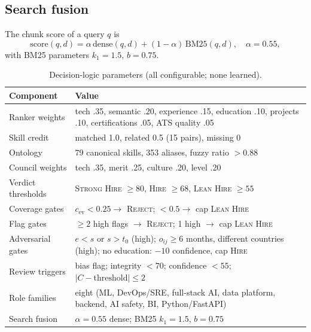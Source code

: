 \documentclass[conference]{IEEEtran}
\newcommand{\verd}[1]{\textsc{#1}}
\newcommand{\Sstrong}{\verd{Strong Hire}}
\newcommand{\Shire}{\verd{Hire}}
\newcommand{\Slean}{\verd{Lean Hire}}
\newcommand{\Sreject}{\verd{Reject}}
\begin{document}
\subsection{Search fusion}
The chunk score of a query $q$ is
\begin{equation}
\mathrm{score}(q,d)=\alpha\,\mathrm{dense}(q,d)+(1-\alpha)\,\mathrm{BM25}(q,d),\quad \alpha=0.55,
\label{eq:fusion}
\end{equation}
with BM25 parameters $k_1=1.5$, $b=0.75$.

\begin{table}[t]
\caption{Decision-logic parameters (all configurable; none learned).}
\label{tab:params}
\centering
\footnotesize
\renewcommand{\arraystretch}{1.1}
\begin{tabular}{@{}lp{5.6cm}@{}}
\toprule
Component & Value \\
\midrule
Ranker weights & tech .35, semantic .20, experience .15, education .10, projects .10, certifications .05, ATS quality .05 \\
Skill credit & matched 1.0, related 0.5 (15 pairs), missing 0 \\
Ontology & 79 canonical skills, 353 aliases, fuzzy ratio $>0.88$ \\
Council weights & tech .35, merit .25, culture .20, level .20 \\
Verdict thresholds & \Sstrong{} $\ge80$, \Shire{} $\ge68$, \Slean{} $\ge55$ \\
Coverage gates & $c_{\mathrm{ev}}<0.25\rightarrow$ \Sreject{}; $<0.5\rightarrow$ cap \Slean{} \\
Flag gates & $\ge2$ high flags $\rightarrow$ \Sreject{}; 1 high $\rightarrow$ cap \Slean{} \\
Adversarial gates & $e<s$ or $s>t_0$ (high); $o_{ij}\ge6$ months, different countries (high); no education: $-10$ confidence, cap \Shire{} \\
Review triggers & bias flag; integrity $<70$; confidence $<55$; $|C-\text{threshold}|\le2$ \\
Role families & eight (ML, DevOps/SRE, full-stack AI, data platform, backend, AI safety, BI, Python/FastAPI) \\
Search fusion & $\alpha=0.55$ dense; BM25 $k_1=1.5$, $b=0.75$ \\
\bottomrule
\end{tabular}
\end{table}

\end{document}
